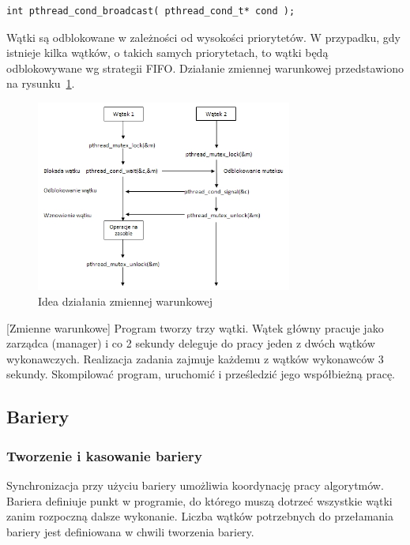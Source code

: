 \begin{lstlisting}[style=MyCStyle]
int pthread_cond_broadcast( pthread_cond_t* cond );
\end{lstlisting}

Wątki są odblokowane w zależności od wysokości priorytetów. W przypadku, gdy istnieje kilka wątków, o takich samych priorytetach, to wątki będą odblokowywane wg strategii FIFO. Działanie zmiennej warunkowej przedstawiono na rysunku~\ref{fig:condvar}. 

\begin{figure}[!h]
\centering
\includegraphics[width=0.75\textwidth]{img/condvar}
\caption{Idea działania zmiennej warunkowej}
\label{fig:condvar}
\end{figure}

\begin{example}{[Zmienne warunkowe]}
Program tworzy trzy wątki. Wątek główny pracuje jako zarządca (manager) i co 2 sekundy deleguje do pracy jeden z dwóch wątków wykonawczych. Realizacja zadania zajmuje każdemu z wątków wykonawców 3 sekundy. Skompilować program, uruchomić i prześledzić jego współbieżną pracę.

\end{example}

\subsection{Bariery} 

\subsubsection{Tworzenie i kasowanie bariery} 

Synchronizacja przy użyciu bariery umożliwia koordynację pracy algorytmów. Bariera definiuje punkt w programie, do którego muszą dotrzeć wszystkie wątki zanim rozpoczną dalsze wykonanie. Liczba wątków potrzebnych do przełamania bariery jest definiowana w chwili tworzenia bariery.

